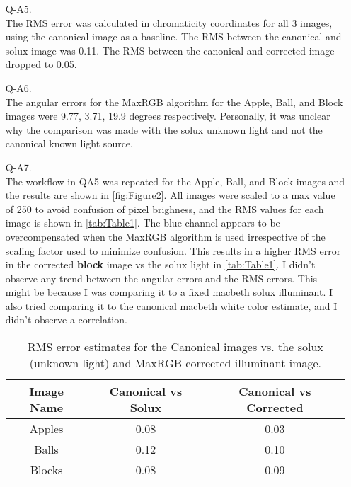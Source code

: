 \documentclass[12pt]{report}
\begin{document}
\begin{enumerate}
    \item[Q-A5.]
    \ \\
    The RMS error was calculated in chromaticity coordinates for all 3 images, using the canonical image as a baseline. The RMS between the canonical and solux 
    image was 0.11. The RMS between the canonical and corrected image dropped to 0.05.

    \item[Q-A6.]
    \ \\
    The angular errors for the MaxRGB algorithm for the Apple, Ball, and Block images were 9.77, 3.71, 19.9 degrees respectively. Personally, it was unclear why 
    the comparison was made with the solux unknown light and not the canonical known light source.

    \item[Q-A7.]
    \ \\
    The workflow in QA5 was repeated for the Apple, Ball, and Block images and the results are shown in \autoref{fig:Figure2}. All images were scaled to a max 
    value of 250 to avoid confusion of pixel brighness, and the RMS values for each image is shown in \autoref{tab:Table1}. The blue channel appears to be 
    overcompensated when the MaxRGB algorithm is used irrespective of the scaling factor used to minimize confusion. This results in a higher RMS error in 
    the corrected \textbf{block} image vs the solux light in \autoref{tab:Table1}. I didn't observe any trend between the angular errors and the RMS errors. 
    This might be because I was comparing it to a fixed macbeth solux illuminant. I also tried comparing it to the canonical macbeth white color estimate, and 
    I didn't observe a correlation.

    \begin{table}[h!]
    \begin{center}
    \begin{tabular}{ | c | c | c | } 
        \hline
        Image Name & Canonical vs Solux & Canonical vs Corrected \\ 
        \hline \hline
        Apples & 0.08 & 0.03 \\ 
        Balls  & 0.12 & 0.10 \\ 
        Blocks & 0.08 & 0.09 \\
        \hline
    \end{tabular}
    \caption{RMS error estimates for the Canonical images vs. the solux (unknown light) and MaxRGB corrected illuminant image.}
    \label{tab:Table1}
    \end{center}
    \end{table}


\end{enumerate}
\end{document}
